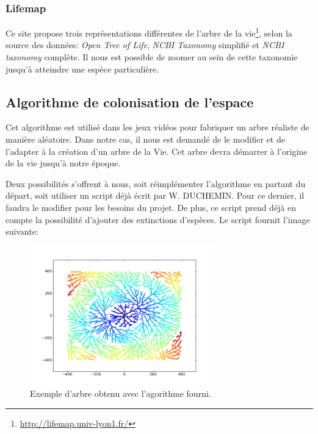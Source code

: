 \documentclass[a4paper]{article}
\begin{document}
		\subsubsection{Lifemap}
			Ce site propose trois représentations différentes de l'arbre de la vie\footnote{\url{http://lifemap.univ-lyon1.fr/}}, selon la source des données: \emph{Open Tree of Life}, \emph{NCBI Taxonomy} simplifié et \emph{NCBI taxonomy} complète. Il nous est possible de zoomer au sein de cette taxonomie jusqu'à atteindre une espèce particulière.

	\subsection{Algorithme de colonisation de l'espace}
		Cet algorithme est utilisé dans les jeux vidéos pour fabriquer un arbre réaliste de manière aléatoire. Dans notre cas, il nous est demandé de le modifier et de l’adapter à la création d’un arbre de la Vie. Cet arbre devra démarrer à l’origine de la vie jusqu’à notre époque.
	
		Deux possibilités s’offrent à nous, soit réimplémenter l’algorithme en partant du départ, soit utiliser un script déjà écrit par W. DUCHEMIN. Pour ce dernier, il faudra le modifier pour les besoins du projet. De plus, ce script prend déjà en compte la possibilité d’ajouter des extinctions d’espèces. Le script fournit l'image suivante:

		\begin{figure}[!h]
			\centering
			\includegraphics[width=8cm]{./img/multipleExtinction.png}
			\caption{Exemple d'arbre obtenu avec l'agorithme fourni.}
		\end{figure}
	
\end{document}
